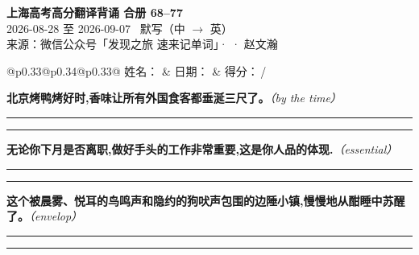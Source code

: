 \documentclass[11pt,a4paper]{article}
\newcommand{\num}[1]{\makebox[1.9em][r]{#1.}\hspace{0.3em}}
\newcommand{\wline}{\noindent\rule{\linewidth}{0.4pt}}
\newcommand{\prompt}[1]{\emph{\textcolor{tipblue}{\small（#1）}}}
\begin{document}
\pagestyle{plain}
\begin{center}
{\LARGE\bfseries 上海高考高分翻译背诵 \quad 合册 68–77}\\[0.25em]
{\large 2026-08-28 至 2026-09-07 \quad\ 默写（中 $\to$ 英）}\\[0.35em]
{\footnotesize 来源：微信公众号「发现之旅 速来记单词」·  · 赵文瀚}
\end{center}

\vspace{0.4em}
\noindent\begin{tabular}{@{}p{0.33\textwidth}@{}p{0.34\textwidth}@{}p{0.33\textwidth}@{}}
姓名：\underline{\hspace{2.0cm}} & 日期：\underline{\hspace{2.0cm}} & 得分：\underline{\hspace{1.4cm}}\,/ \\
\end{tabular}

\vspace{0.5em}

\vspace{0.8em}
\vspace{0.35em}\vspace{0.15em}

\begin{minipage}{\linewidth}

\num{1}\textbf{北京烤鸭烤好时,香味让所有外国食客都垂涎三尺了。}\prompt{by the time}

\vspace{0.3em}

\wline\vspace{0.3em}
\wline

\end{minipage}

\begin{minipage}{\linewidth}

\num{2}\textbf{无论你下月是否离职,做好手头的工作非常重要,这是你人品的体现.}\prompt{essential}

\vspace{0.3em}

\wline\vspace{0.3em}
\wline

\end{minipage}

\begin{minipage}{\linewidth}

\num{3}\textbf{这个被晨雾、悦耳的鸟鸣声和隐约的狗吠声包围的边陲小镇,慢慢地从酣睡中苏醒了。}\prompt{envelop}

\vspace{0.3em}

\wline\vspace{0.3em}
\wline

\end{minipage}
\end{document}
